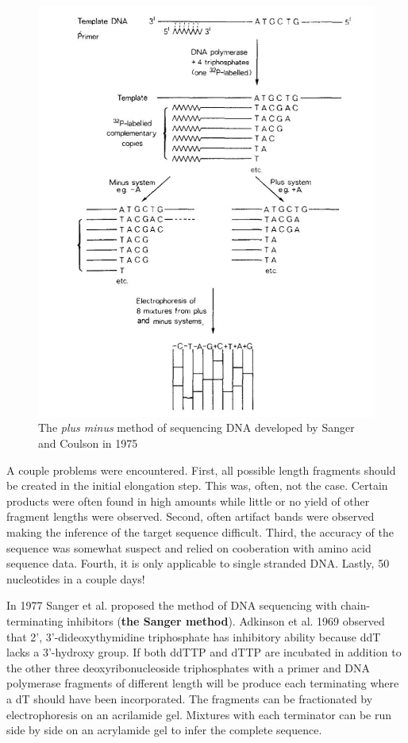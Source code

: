 \documentclass{report}\usepackage[]{graphicx}\usepackage[]{color}
\begin{document}
\begin{figure}[h]
\centering
     \includegraphics[width=.5\textwidth]{images/Plus_Minus.pdf}
    \caption{The \textit{plus minus} method of sequencing DNA developed 
by Sanger and Coulson in 1975}\label{fig:Plus_Minus}
\end{figure}

A couple problems were encountered. First, all possible length fragments should 
be created in the initial elongation
step. This was, often, not the case. Certain products were often found in high 
amounts while little or no yield of 
other fragment lengths were observed. Second, often artifact bands were 
observed making the inference of the
target sequence difficult. Third, the accuracy of the sequence was somewhat 
suspect and relied on cooberation
with amino acid sequence data. Fourth, it is only applicable to single stranded 
DNA. Lastly, 50 nucleotides in a couple days!  

In 1977 Sanger et al. proposed the method of DNA sequencing with chain-terminating
 inhibitors (\textbf{the Sanger
method}). Adkinson et al. 1969 observed that 2', 3'-dideoxythymidine triphosphate has
 inhibitory ability because ddT 
lacks a 3'-hydroxy group. If both ddTTP and dTTP are incubated in addition to the other three 
deoxyribonucleoside triphosphates with a primer and DNA polymerase 
fragments of different length 
will be produce each terminating 
where a dT should have been incorporated. The fragments can be fractionated by electrophoresis on an 
acrilamide gel. Mixtures with each terminator can be run side by side on an 
acrylamide gel to infer the complete 
sequence. 
\end{document}
